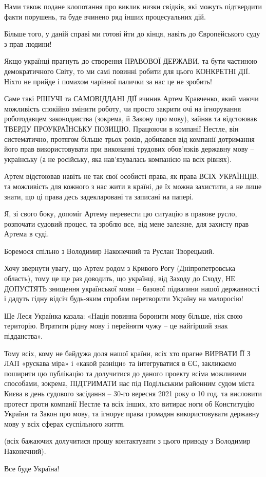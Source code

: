 Нами також подане клопотання про виклик низки свідків, які можуть підтвердити
факти порушень, та буде вчинено ряд інших процесуальних дій.

Більше того, у даній справі ми готові йти до кінця, навіть до Європейського
суду з прав людини! 

Якщо українці прагнуть до створення ПРАВОВОЇ ДЕРЖАВИ, та бути частиною
демократичного Світу, то ми самі повинні робити для цього КОНКРЕТНІ ДІЇ. Ніхто
не прийде і помахом чарівної палички за нас це не зробить! 

Саме такі РІШУЧІ та САМОВІДДАНІ ДІЇ вчинив Артем Кравченко, який маючи
можливість спокійно змінити роботу, чи просто закрити очі на ігнорування
роботодавцем законодавства (зокрема, й Закону про мову), зайняв та відстоював
ТВЕРДУ ПРОУКРАЇНСЬКУ ПОЗИЦІЮ. Працюючи в компанії Нестле, він систематично,
протягом більше трьох років, добивався від компанії дотримання його прав
використовувати при виконанні трудових обов’язків державну мову – українську (а
не російську, яка нав’язувалась компанією на всіх рівнях). 

Артем відстоював навіть не так свої особисті права, як права ВСІХ УКРАЇНЦІВ, та
можливість для кожного з нас жити в країні, де їх можна захистити, а не лише
знати, що ці права десь задекларовані та записані на папері. 

Я, зі свого боку, допоміг Артему перевести цю ситуацію в правове русло,
розпочати судовий процес, та зроблю все, від мене залежне, для захисту прав
Артема в суді.

Боремося спільно з Володимир Наконечний та Руслан Творецький.

Хочу звернути увагу, що Артем родом з Кривого Рогу (Дніпропетровська область),
тому це ще раз доводить, що українці, від Заходу до Сходу, НЕ ДОПУСТЯТЬ
знищення української мови – базової підвалини нашої державності і дадуть гідну
відсіч будь-яким спробам перетворити Україну на малоросію! 

Ще Леся Українка казала: «Нація повинна боронити мову більше, ніж свою
територію. Втратити рідну мову і перейняти чужу – це найгірший знак
підданства». 

Тому всіх, кому не байдужа доля нашої країни, всіх хто прагне ВИРВАТИ ЇЇ З ЛАП
«рускава міра» і «какой разніци» та інтегруватися в ЄС, закликаємо поширити цю
публікацію та долучитися до даного проекту всіма можливими способами, зокрема,
ПІДТРИМАТИ нас під Подільським районним судом міста Києва в день судового
засідання – 30-го вересня 2021 року о 10 год. та висловити протест проти
компанії Нестле та всіх інших, хто витирає ноги об Конституцію України та Закон
про мову, та ігнорує права громадян використовувати державну мову у всіх сферах
суспільного життя.

(всіх бажаючих долучитися прошу контактувати з цього приводу з Володимир Наконечний). 

Все буде Україна!
